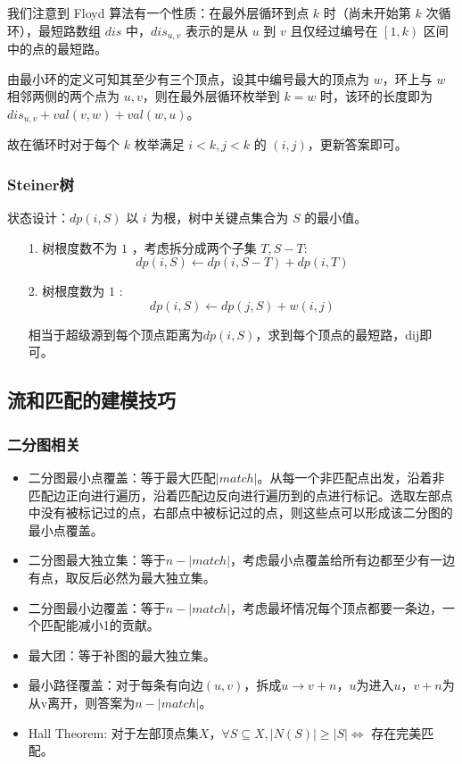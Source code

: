 \documentclass[twoside]{article}
\begin{document}
我们注意到 Floyd 算法有一个性质：在最外层循环到点 $k$ 时（尚未开始第 $k$ 次循环），最短路数组 $dis$ 中，$dis_{u,v}$ 表示的是从 $u$ 到 $v$ 且仅经过编号在 $\left[1, k\right)$ 区间中的点的最短路。

由最小环的定义可知其至少有三个顶点，设其中编号最大的顶点为 $w$，环上与 $w$ 相邻两侧的两个点为 $u,v$，则在最外层循环枚举到 $k=w$ 时，该环的长度即为 $dis_{u,v}+val\left(v,w\right)+val\left(w,u\right)$。

故在循环时对于每个 $k$ 枚举满足 $i<k,j<k$ 的 $(i,j)$，更新答案即可。\subsubsection{Steiner树}
状态设计：$dp(i,S)$ 以 $i$ 为根，树中关键点集合为 $S$ 的最小值。

\begin{enumerate}
    \item[1.] 树根度数不为 $1$ ，考虑拆分成两个子集 $T,S-T$:
    $$ dp(i,S) \gets dp(i,S-T)+dp(i,T) $$
    \item[2.] 树根度数为 $1$ :
    $$ dp(i,S) \gets dp(j,S)+w(i,j) $$

    相当于超级源到每个顶点距离为$dp(i,S)$，求到每个顶点的最短路，dij即可。
\end{enumerate}
\subsection{流和匹配的建模技巧}
\subsubsection{二分图相关}
\begin{itemize}
    \item 二分图最小点覆盖：等于最大匹配$|match|$。从每一个非匹配点出发，沿着非匹配边正向进行遍历，沿着匹配边反向进行遍历到的点进行标记。选取左部点中没有被标记过的点，右部点中被标记过的点，则这些点可以形成该二分图的最小点覆盖。
    \item 二分图最大独立集：等于$n-|match|$，考虑最小点覆盖给所有边都至少有一边有点，取反后必然为最大独立集。
    \item 二分图最小边覆盖：等于$n-|match|$，考虑最坏情况每个顶点都要一条边，一个匹配能减小1的贡献。
    \item 最大团：等于补图的最大独立集。
    \item 最小路径覆盖：对于每条有向边$(u,v)$，拆成$u\to v+n$，$u$为进入$u$，$v+n$为从v离开，则答案为$n-|match|$。
    \item Hall Theorem: 对于左部顶点集$X$，$\forall S\subseteq X, |N(S)|\ge |S|\iff$ 存在完美匹配。
\end{itemize}
\end{document}
